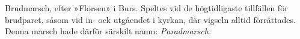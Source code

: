 Brudmarsch, efter »Florsen» i Burs. Speltes vid de högtidligaste tillfällen för brudparet, såsom vid in- ock
utgåendet i kyrkan, där vigseln alltid förrättades. Denna marsch hade
därför särskilt namn: \textit{Paradmarsch.}